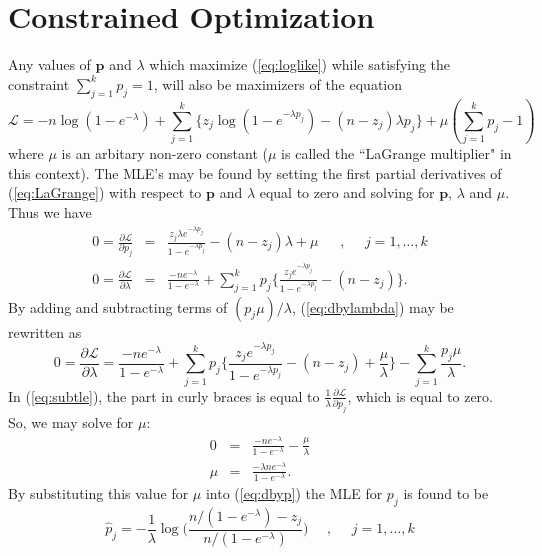 \documentclass[12pt,titlepage]{article}
\newcommand{\bp}{\mathbf{p}}
\newcommand{\LLL}{\mathcal{L}}
\begin{document}
\section{Constrained Optimization}
Any values of $\bp$ and $\lambda$ which maximize
(\ref{eq:loglike}) while satisfying the constraint $\sum_{j=1}^k p_j =1$,
will also be maximizers of the equation
\begin{equation}
\LLL = -n \log(1-e^{-\lambda}) + \sum_{j=1}^k
\{z_j \log(1-e^{-\lambda p_j}) - (n-z_j)\lambda p_j\} + \mu
(\sum_{j=1}^k p_j - 1)
\label{eq:LaGrange}
\end{equation}
where $\mu$ is an arbitary non-zero constant ($\mu$ is called the
``LaGrange multiplier" in this context).  The MLE's may be found
by setting the first partial derivatives of (\ref{eq:LaGrange}) with
respect to $\bp$ and
$\lambda$ equal to zero and solving for $\bp$, $\lambda$ and $\mu$.  Thus
we have
\begin{eqnarray}
0 = \frac{\partial\LLL}{\partial p_j} & = &\frac{z_j \lambda e^{-\lambda
p_j} }{1-e^{-\lambda p_j}} - (n - z_j)\lambda + \mu~~~~~~~,~~~~~~j =
1,\ldots, k \label{eq:dbyp}\\
0 = \frac{\partial\LLL}{\partial \lambda} & = & 
\frac{-ne^{-\lambda} }{1-e^{-\lambda}} + \sum_{j=1}^k  p_j
\biggl\{\frac{z_j  e^{-\lambda
p_j} }{1-e^{-\lambda p_j}} - (n - z_j) \biggr\}. \label{eq:dbylambda}
\end{eqnarray}
By adding and subtracting terms of
$(p_j\mu)/ \lambda$, (\ref{eq:dbylambda}) may be rewritten as 
\begin{equation}
0 = \frac{\partial\LLL}{\partial \lambda}  =  
\frac{-ne^{-\lambda} }{1-e^{-\lambda}} + \sum_{j=1}^k  p_j
\biggl\{\frac{z_j  e^{-\lambda
p_j} }{1-e^{-\lambda p_j}} - (n - z_j) + \frac{\mu}{\lambda} \biggr\} -
\sum_{j=1}^k \frac{p_j \mu}{\lambda}.
\label{eq:subtle}
\end{equation}
In (\ref{eq:subtle}), the part in curly braces is equal to
$\frac{1}{\lambda}\frac{\partial\LLL}{\partial p_j}$, which is
equal to zero.  So, we may solve for $\mu$:
\begin{eqnarray}
0 & =  & 
\frac{-ne^{-\lambda} }{1-e^{-\lambda}}  -
 \frac{ \mu}{\lambda} \nonumber  \\
\mu & = & \frac{-\lambda n e^{-\lambda}}{1-e^{-\lambda}}. \nonumber
\end{eqnarray}
By substituting this value for $\mu$ into (\ref{eq:dbyp}) the MLE for
$p_j$ is found to be 
\begin{equation}
\hat{p}_j = -\frac{1}{\lambda} \log\biggl( \frac{ n/(1-e^{-\lambda}) -
z_j}{n/(1-e^{-\lambda})}\biggr)~~~~~~,~~~~~~j = 1,\ldots,k
\label{eq:phat}
\end{equation}
\end{document}
